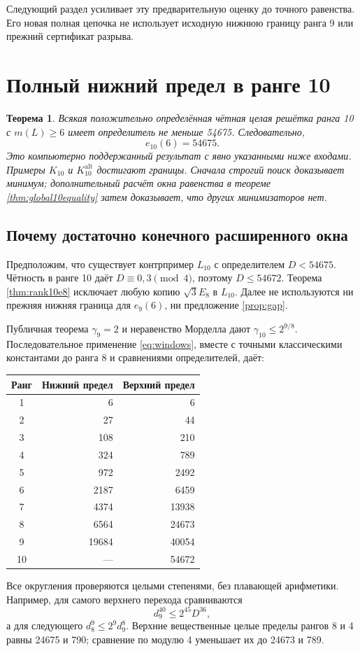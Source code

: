 \documentclass[11pt,a4paper]{article}
\newtheorem{theorem}{Теорема}[section]
\theoremstyle{remark}\newtheorem{remark}[theorem]{Замечание}
\newcommand{\Kalt}{K_{10}^{\mathrm{alt}}}
\begin{document}
Следующий раздел усиливает эту предварительную оценку до точного равенства. Его новая полная цепочка не использует исходную нижнюю границу ранга 9 или прежний сертификат разрыва.

\section{Полный нижний предел в ранге 10}\label{sec:global10exact}

\begin{theorem}\label{thm:e10exact}
Всякая положительно определённая чётная целая решётка ранга 10 с $m(L)\ge6$ имеет определитель не меньше 54675. Следовательно,
\[
\boxed{e_{10}(6)=54675}.
\]
Это компьютерно поддержанный результат с явно указанными ниже входами. Примеры $K_{10}$ и $\Kalt$ достигают границы. Сначала строгий поиск доказывает минимум; дополнительный расчёт окна равенства в теореме \ref{thm:global10equality} затем доказывает, что других минимизаторов нет.
\end{theorem}

\subsection{Почему достаточно конечного расширенного окна}

Предположим, что существует контрпример $L_{10}$ с определителем $D<54675$. Чётность в ранге 10 даёт $D\equiv0,3\pmod4$, поэтому $D\le54672$. Теорема \ref{thm:rank10e8} исключает любую копию $\sqrt3E_8$ в $L_{10}$. Далее не используются ни прежняя нижняя граница для $e_9(6)$, ни предложение \ref{prop:gap}.

Публичная теорема $\gamma_9=2$ и неравенство Морделла дают $\gamma_{10}\le2^{9/8}$. Последовательное применение \eqref{eq:windows}, вместе с точными классическими константами до ранга 8 и сравнениями определителей, даёт:
\begin{center}
\begin{tabular}{crr}
\toprule
Ранг & Нижний предел & Верхний предел\\\midrule
1&6&6\\
2&27&44\\
3&108&210\\
4&324&789\\
5&972&2492\\
6&2187&6459\\
7&4374&13938\\
8&6564&24673\\
9&19684&40054\\
10&---&54672\\
\bottomrule
\end{tabular}
\end{center}
Все округления проверяются целыми степенями, без плавающей арифметики. Например, для самого верхнего перехода сравниваются
\[
d_9^{40}\le2^{45}D^{36},
\]
а для следующего $d_8^9\le2^9d_9^8$. Верхние вещественные целые пределы рангов 8 и 4 равны 24675 и 790; сравнение по модулю 4 уменьшает их до 24673 и 789.
\end{document}
